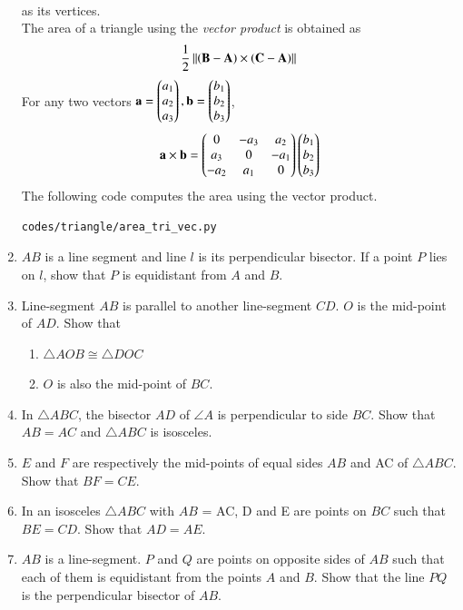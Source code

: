 \begin{enumerate}[label=\arabic*.,ref=\thesubsection.\theenumi]
\begin{align}
\end{align}
%
as its vertices.
\\
\solution The area of a triangle using the {\em vector product} is obtained as
\begin{align}
\frac{1}{2}\left\lVert\left(\mathbf{B}-\mathbf{A}\right)\times \left(\mathbf{C}-\mathbf{A}\right)\right\rVert
\end{align}
%
For any two vectors $\mathbf{a}=\begin{pmatrix}a_1\\a_2\\a_3\end{pmatrix}, \mathbf{b}=\begin{pmatrix}b_1\\b_2\\b_3\end{pmatrix}$, 
\begin{align}
\label{eq:tri_cross_prod}
\mathbf{a}\times \mathbf{b} = \begin{pmatrix}0 & -a_3 & a_2 \\ a_3 & 0 & -a_1 \\ -a_2 & a_1 & 0\end{pmatrix}\begin{pmatrix}b_1\\b_2\\b_3\end{pmatrix}
\end{align}
%
The following code computes the area using the vector product.
%
\begin{lstlisting}
codes/triangle/area_tri_vec.py
\end{lstlisting}
%
%
\item $AB$ is a line segment and line $l$ is its perpendicular bisector. If a point $P$ lies on $l$, show that $P$ is equidistant from $A$ and $B$.
\item Line-segment $AB$ is parallel to another line-segment $CD$. $O$ is the mid-point of $AD$. Show that 
\begin{enumerate}
\item  $\triangle AOB \cong \triangle DOC$ 
\item  $O$ is also the mid-point of $BC$.
\end{enumerate}
%
\item In $\triangle ABC$, the bisector $AD$ of $\angle  A$ is perpendicular to side $BC$. Show that $AB = AC$ and $\triangle ABC$ is isosceles.
\item $E$ and $F$ are respectively the mid-points of equal sides $AB$ and AC of $\triangle ABC$. Show that $BF = CE$. 
\item In an isosceles $\triangle ABC$ with $AB$ = AC, D and E are points on $BC$ such that $BE = CD$. Show that $AD = AE$. 
%
\item $AB$ is a line-segment. $P$ and $Q$ are points on opposite sides of $AB$ such that each of them is equidistant from the points $A$ and $B$. Show that the line $PQ $ is the perpendicular bisector of $AB$.

\end{enumerate}
